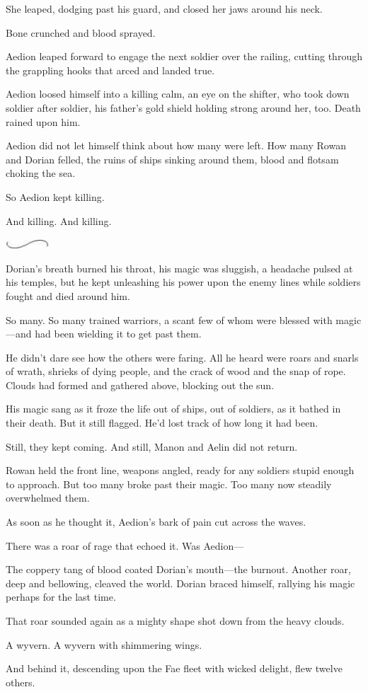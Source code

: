 She leaped, dodging past his guard, and closed her jaws around his neck.

Bone crunched and blood sprayed.

Aedion leaped forward to engage the next soldier over the railing, cutting through the grappling hooks that arced and landed true.

Aedion loosed himself into a killing calm, an eye on the shifter, who took down soldier after soldier, his father's gold shield holding strong around her, too.
Death rained upon him.

Aedion did not let himself think about how many were left.
How many Rowan and Dorian felled, the ruins of ships sinking around them, blood and flotsam choking the sea.

So Aedion kept killing.

And killing.
And killing.

\begin{center}
	\includegraphics[width=0.65in,height=0.13in]{images/seperator}
\end{center}

Dorian's breath burned his throat, his magic was sluggish, a headache pulsed at his temples, but he kept unleashing his power upon the enemy lines while soldiers fought and died around him.

So many.
So many trained warriors, a scant few of whom were blessed with magic---and had been wielding it to get past them.

He didn't dare see how the others were faring.
All he heard were roars and snarls of wrath, shrieks of dying people, and the crack of wood and the snap of rope.
Clouds had formed and gathered above, blocking out the sun.

His magic sang as it froze the life out of ships, out of soldiers, as it bathed in their death.
But it still flagged.
He'd lost track of how long it had been.

Still, they kept coming.
And still, Manon and Aelin did not return.

Rowan held the front line, weapons angled, ready for any soldiers stupid enough to approach.
But too many broke past their magic.
Too many now steadily overwhelmed them.

As soon as he thought it, Aedion's bark of pain cut across the waves.

There was a roar of rage that echoed it.
Was Aedion---

The coppery tang of blood coated Dorian's mouth---the burnout.
Another roar, deep and bellowing, cleaved the world.
Dorian braced himself, rallying his magic perhaps for the last time.

That roar sounded again as a mighty shape shot down from the heavy clouds.

A wyvern.
A wyvern with shimmering wings.

And behind it, descending upon the Fae fleet with wicked delight, flew twelve others.

